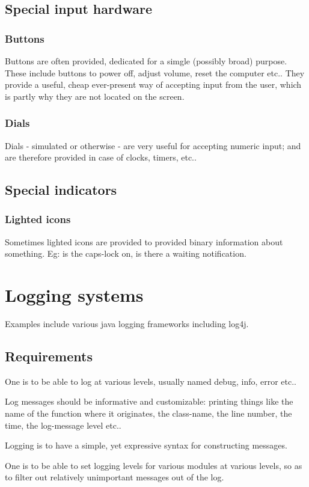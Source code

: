 \documentclass[oneside, article]{memoir}
\begin{document}
\section{Special input hardware}
\subsection{Buttons}
Buttons are often provided, dedicated for a simgle (possibly broad) purpose. These include buttons to power off, adjust volume, reset the computer etc.. They provide a useful, cheap ever-present way of accepting input from the user, which is partly why they are not located on the screen.

\subsection{Dials}
Dials - simulated or otherwise - are very useful for accepting numeric input; and are therefore provided in case of clocks, timers, etc..

\section{Special indicators}
\subsection{Lighted icons}
Sometimes lighted icons are provided to provided binary information about something. Eg: is the caps-lock on, is there a waiting notification.

\chapter{Logging systems}
Examples include various java logging frameworks including log4j.

\section{Requirements}
One is to be able to log at various levels, usually named debug, info, error etc..

Log messages should be informative and customizable: printing things like the name of the function where it originates, the class-name, the line number, the time, the log-message level etc..

Logging is to have a simple, yet expressive syntax for constructing messages.

One is to be able to set logging levels for various modules at various levels, so as to filter out relatively unimportant messages out of the log.
\end{document}
